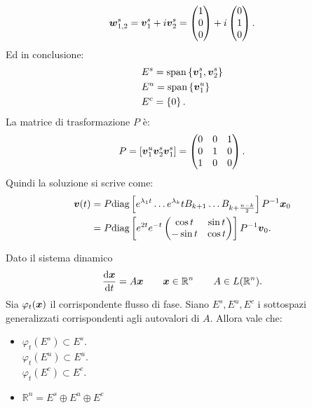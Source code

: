 \begin{exmp}
    \[
        \boldsymbol{w}_{1,2}^s = \boldsymbol{v}_{1}^s + i \boldsymbol{v}_2^s = \begin{pmatrix} 1  \\ 0 \\ 0 \end{pmatrix}  + 
	i \begin{pmatrix} 0  \\ 1 \\ 0 \end{pmatrix}
    .\] 
    Ed in conclusione:
    \[\begin{aligned}
	& E^s = \text{span}\left\{\boldsymbol{v}_1^s, \boldsymbol{v}_2^s\right\}\\
	& E^u = \text{span}\left\{\boldsymbol{v}_1^u\right\}\\
	& E^c = \left\{0\right\}
    .\end{aligned}\]
    La matrice di trasformazione $P$ è:
    \[
        P = \left[\boldsymbol{v}_1^u \boldsymbol{v}_2^s \boldsymbol{v}_1^s\right] = 
    \begin{pmatrix}
	0  & 0 & 1 \\
	0 & 1 & 0 \\
	1 & 0 & 0 \\
    \end{pmatrix}
    .\] 
    Quindi la soluzione si scrive come:
    \[\begin{aligned}
	\boldsymbol{v}(t) &= P \text{diag}\left[e^{\lambda_1 t}\ldots e^{\lambda_k}t B_{k+1}\ldots B_{k + \frac{n-k}{2}}\right]P^{-1}\boldsymbol{x}_0\\
		 & = P \text{diag}\left[e^{2t}e^{-t}
	\begin{pmatrix}
	    \cos t & \sin t  \\
	    -\sin t & \cos  t \\
	\end{pmatrix}
		 \right]
		 P^{-1}\boldsymbol{v}_0
    .\end{aligned}\]
\end{exmp}
\noindent
\begin{thm}
    Dato il sistema dinamico \[
	\frac{\text{d} \boldsymbol{x}}{\text{d} t} = A \boldsymbol{x} \qquad  \boldsymbol{x}\in \mathbb{R}^n \qquad  A \in L(\mathbb{R}^n) 
    .\] 
    Sia $\varphi_t(\boldsymbol{x})$ il corrispondente flusso di fase. Siano $E^s, E^u, E^c$ i sottospazi generalizzati corrispondenti agli autovalori di $A$. Allora vale che:
    \begin{itemize}
	\item 
	    $\varphi_t(E^s) \subset E^s$.\\
            $\varphi_t(E^u) \subset E^u$.\\
            $\varphi_t(E^c) \subset E^c$.
	\item $\mathbb{R}^n = E^s \oplus E^u \oplus E^c$ 
    \end{itemize}
\end{thm}
